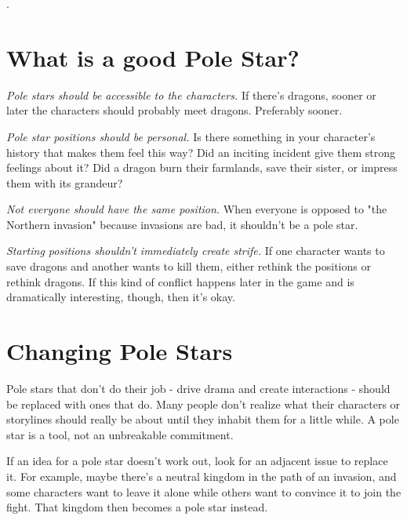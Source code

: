 \documentclass[10pt,oneside,letterpaper,landscape]{memoir}
\begin{document}
\begin{multicols}{3}
\vfill\null %

\columnbreak

{\color{white}.}
\vspace{19mm}

\section{What is a good Pole Star?}

\textit{Pole stars should be accessible to the characters.} If there's dragons, sooner or later the characters should probably meet dragons. Preferably sooner.

\textit{Pole star positions should be personal.} Is there something in your character's history that makes them feel this way? Did an inciting incident give them strong feelings about it? Did a dragon burn their farmlands, save their sister, or impress them with its grandeur?

\textit{Not everyone should have the same position.} When everyone is opposed to "the Northern invasion" because invasions are bad, it shouldn't be a pole star.

\textit{Starting positions shouldn't immediately create strife.} If one character wants to save dragons and another wants to kill them, either rethink the positions or rethink dragons. If this kind of conflict happens later in the game and is dramatically interesting, though, then it's okay.

\section{Changing Pole Stars}

Pole stars that don't do their job - drive drama and create interactions - should be replaced with ones that do. Many people don't realize what their characters or storylines should really be about until they inhabit them for a little while. A pole star is a tool, not an unbreakable commitment.

If an idea for a pole star doesn't work out, look for an adjacent issue to replace it. For example, maybe there's a neutral kingdom in the path of an invasion, and some characters want to leave it alone while others want to convince it to join the fight. That kingdom then becomes a pole star instead.


\end{multicols}
\end{document}
